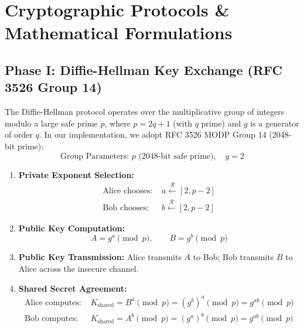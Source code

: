 \documentclass[11pt,a4paper]{article}
\begin{document}
\section{Cryptographic Protocols \& Mathematical Formulations}

\subsection{Phase I: Diffie-Hellman Key Exchange (RFC 3526 Group 14)}
The Diffie-Hellman protocol operates over the multiplicative group of integers modulo a large safe prime $p$, where $p = 2q + 1$ (with $q$ prime) and $g$ is a generator of order $q$. In our implementation, we adopt RFC 3526 MODP Group 14 (2048-bit prime):
\begin{equation}
    \text{Group Parameters: } p \text{ (2048-bit safe prime)}, \quad g = 2
\end{equation}

\begin{enumerate}[leftmargin=1cm]
    \item \textbf{Private Exponent Selection:}
    \begin{align}
        \text{Alice chooses: } & a \xleftarrow{\mathcal{R}} [2, p-2] \\
        \text{Bob chooses: } & b \xleftarrow{\mathcal{R}} [2, p-2]
    \end{align}
    \item \textbf{Public Key Computation:}
    \begin{equation}
        A = g^a \pmod{p}, \qquad B = g^b \pmod{p}
    \end{equation}
    \item \textbf{Public Key Transmission:} Alice transmits $A$ to Bob; Bob transmits $B$ to Alice across the insecure channel.
    \item \textbf{Shared Secret Agreement:}
    \begin{align}
        \text{Alice computes: } & K_{\text{shared}} = B^a \pmod{p} = (g^b)^a \pmod{p} = g^{ab} \pmod{p} \\
        \text{Bob computes: } & K_{\text{shared}} = A^b \pmod{p} = (g^a)^b \pmod{p} = g^{ab} \pmod{p}
    \end{align}
\end{enumerate}
\end{document}
